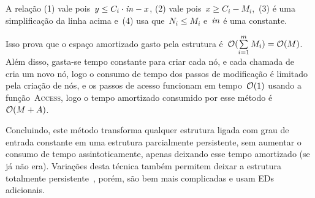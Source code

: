 \documentclass[../../main.tex]{subfiles}
\begin{document}
A relação (1) vale pois~$y \leq C_i \cdot \mathit{in} - x$, (2) vale pois~$x \geq C_i - M_i$,~(3) é uma simplificação da linha acima e~(4) usa que~$N_i \leq M_i$ e~$\mathit{in}$ é uma constante.

Isso prova que o espaço amortizado gasto pela estrutura é~${\mathcal{O}(\sum\limits_{i=1}^m{M_i}) = \mathcal{O}(M)}$. Além disso, gasta-se tempo constante para criar cada nó, e cada chamada de~\textsc{} cria um novo nó, logo o consumo de tempo dos passos de modificação é limitado pela criação de nós, e os passos de acesso funcionam em tempo~$\mathcal{O}(1)$ usando a função~\textsc{Access}, logo o tempo amortizado consumido por esse método é~$\mathcal{O}(M+A)$.

Concluindo, este método transforma qualquer estrutura ligada com grau de entrada constante em uma estrutura parcialmente persistente, sem aumentar o consumo de tempo assintoticamente, apenas deixando esse tempo amortizado (se já não era). Variações desta técnica também permitem deixar a estrutura totalmente persistente~\cite{DriscollSST1989}, porém, são bem mais complicadas e usam EDs adicionais.
\end{document}
